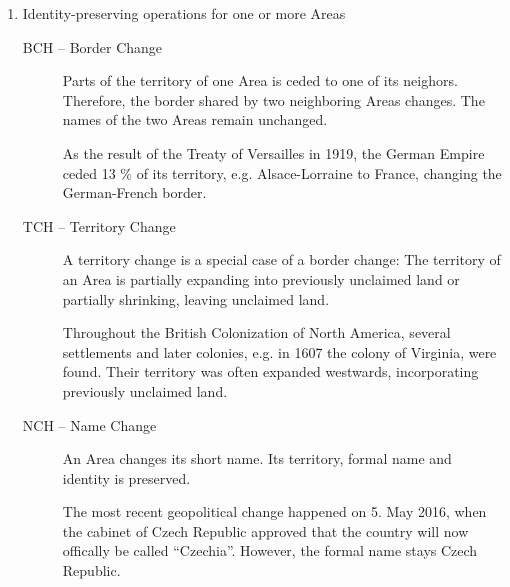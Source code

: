 \begin{enumerate}
  \item Identity-preserving operations for one or more Areas
  \begin{description}
    \item[BCH -- Border Change]
    Parts of the territory of one Area is ceded to one of its neighors. Therefore, the border shared by two neighboring Areas changes. The names of the two Areas remain unchanged.\\
    \begin{footnotesize}
      As the result of the Treaty of Versailles in 1919, the German Empire ceded 13 \% of its territory, e.g. Alsace-Lorraine to France, changing the German-French border.
    \end{footnotesize}
    \item[TCH -- Territory Change]
    A territory change is a special case of a border change: The territory of an Area is partially expanding into previously unclaimed land or partially shrinking, leaving unclaimed land. \\
    \begin{footnotesize}
      Throughout the British Colonization of North America, several settlements and later colonies, e.g. in 1607 the colony of Virginia, were found. Their territory was often expanded westwards, incorporating previously unclaimed land.
    \end{footnotesize}
    \item[NCH -- Name Change]
    An Area changes its short name. Its territory, formal name and identity is preserved. \\
    \begin{footnotesize}
      The most recent geopolitical change happened on 5. May 2016, when the cabinet of Czech Republic approved that the country will now offically be called ``Czechia''. However, the formal name stays Czech Republic.
    \end{footnotesize}
  \end{description}
\end{enumerate}

